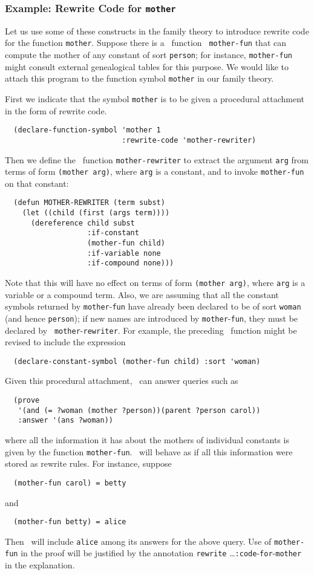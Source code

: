 \subsubsection{Example: Rewrite Code for {\tt mother}}

Let us use some of these constructs in the family theory to introduce rewrite
code for the function {\tt mother}.  Suppose there is a \lisp\   function {\tt
mother-fun} that can compute the mother of any constant of sort {\tt person};
for instance, {\tt mother-fun} might consult external genealogical tables for
this purpose.  We would like to attach this program to the function symbol
{\tt mother} in our family theory.

First we indicate that the symbol {\tt mother} is to be given a procedural
attachment in the form of rewrite code.
\begin{verbatim}
  (declare-function-symbol 'mother 1
                           :rewrite-code 'mother-rewriter)
\end{verbatim}
Then we define the \lisp\ function {\tt mother-rewriter}
    to extract the argument {\tt arg} from terms of form \verb'(mother arg)',
    where {\tt arg} is a constant, and to invoke {\tt mother-fun} on that
    constant:
\begin{verbatim}
  (defun MOTHER-REWRITER (term subst)
    (let ((child (first (args term))))
      (dereference child subst
                   :if-constant
                   (mother-fun child)
                   :if-variable none
                   :if-compound none)))
\end{verbatim}
Note that this will have no effect on terms of form \verb'(mother arg)',
where {\tt arg} is a variable or a compound term.  Also, we are assuming that
all the constant symbols returned by {\tt mother}-{\tt fun} have already been
declared to be of sort {\tt woman} (and hence {\tt person}); if new names are
introduced by {\tt mother}-{\tt fun}, they must be declared by {\tt
mother}-{\tt rewriter}.  For example, the preceding \lisp\  function might be
revised to include the expression
\begin{verbatim}
  (declare-constant-symbol (mother-fun child) :sort 'woman)
\end{verbatim}

Given this procedural attachment, \snark\  can answer queries such as
\begin{verbatim}
  (prove
   '(and (= ?woman (mother ?person))(parent ?person carol))
   :answer '(ans ?woman))
\end{verbatim}
where all the information it has about the mothers of individual constants is
given by the function {\tt mother-fun}.  \Snark\  will behave as if all this
information were stored as rewrite rules.  For instance, suppose
\begin{verbatim}
  (mother-fun carol) = betty
\end{verbatim}
and
\begin{verbatim}
  (mother-fun betty) = alice
\end{verbatim}
Then \snark\  will include {\tt alice} among its answers for the above query.
Use of {\tt mother-fun} in the proof will be justified by the annotation
 {\tt rewrite} \ldots {\tt :code}-{\tt for}-{\tt mother} in the explanation.

